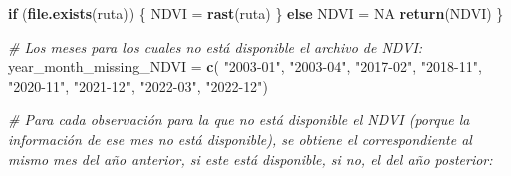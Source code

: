 \documentclass[12pt,a4paper,]{book}
\newenvironment{Shaded}{\begin{snugshade}}{\end{snugshade}}
\newcommand{\CommentTok}[1]{\textcolor[rgb]{0.56,0.35,0.01}{\textit{#1}}}
\newcommand{\ConstantTok}[1]{\textcolor[rgb]{0.56,0.35,0.01}{#1}}
\newcommand{\ControlFlowTok}[1]{\textcolor[rgb]{0.13,0.29,0.53}{\textbf{#1}}}
\newcommand{\FunctionTok}[1]{\textcolor[rgb]{0.13,0.29,0.53}{\textbf{#1}}}
\newcommand{\NormalTok}[1]{#1}
\newcommand{\OtherTok}[1]{\textcolor[rgb]{0.56,0.35,0.01}{#1}}
\newcommand{\StringTok}[1]{\textcolor[rgb]{0.31,0.60,0.02}{#1}}
\numberwithin{dummy}{section}
\theoremstyle{ocrenumbox}
\theoremstyle{blacknumex}
\theoremstyle{blacknumbox}
\theoremstyle{ocrenum}
\theoremstyle{ocrenum}
\begin{document}
\begin{Shaded}
\begin{Highlighting}[]
  \ControlFlowTok{if}\NormalTok{ (}\FunctionTok{file.exists}\NormalTok{(ruta)) \{}
\NormalTok{    NDVI }\OtherTok{=} \FunctionTok{rast}\NormalTok{(ruta)}
\NormalTok{  \} }\ControlFlowTok{else}
\NormalTok{    NDVI }\OtherTok{=} \ConstantTok{NA}
  \FunctionTok{return}\NormalTok{(NDVI)}
\NormalTok{\}}

\CommentTok{\# Los meses para los cuales no está disponible el archivo de NDVI:}
\NormalTok{year\_month\_missing\_NDVI }\OtherTok{=} \FunctionTok{c}\NormalTok{(}
\StringTok{"2003{-}01"}\NormalTok{,}
\StringTok{"2003{-}04"}\NormalTok{,}
\StringTok{"2017{-}02"}\NormalTok{,}
\StringTok{"2018{-}11"}\NormalTok{,}
\StringTok{"2020{-}11"}\NormalTok{,}
\StringTok{"2021{-}12"}\NormalTok{,}
\StringTok{"2022{-}03"}\NormalTok{,}
\StringTok{"2022{-}12"}\NormalTok{)}

\CommentTok{\# Para cada observación para la que no está disponible el NDVI (porque la información de ese mes no está disponible), se obtiene el correspondiente al mismo mes del año anterior, si este está disponible, si no, el del año posterior:}


\end{Highlighting}
\end{Shaded}
\end{document}
